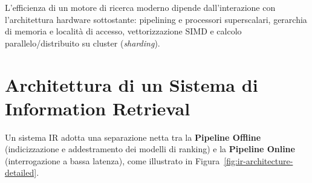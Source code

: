L'efficienza di un motore di ricerca moderno dipende dall'interazione con l'architettura hardware sottostante: pipelining e processori superscalari, gerarchia di memoria e localit\`a di accesso, vettorizzazione SIMD e calcolo parallelo/distribuito su cluster (\textit{sharding}).

\FloatBarrier
\section{Architettura di un Sistema di Information Retrieval}

Un sistema IR adotta una separazione netta tra la \textbf{Pipeline Offline} (indicizzazione e addestramento dei modelli di ranking) e la \textbf{Pipeline Online} (interrogazione a bassa latenza), come illustrato in Figura~\ref{fig:ir-architecture-detailed}.

